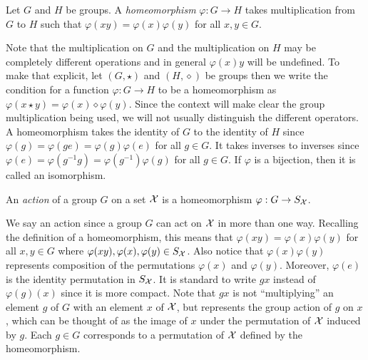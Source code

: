 \begin{definition}
Let $G$ and $H$ be groups.  A \emph{homeomorphism} $\varphi: G \to H$ takes multiplication
from $G$ to $H$ such that $\varphi(xy) = \varphi(x)\varphi(y)$ for all $x, y \in G$.
\end{definition}

Note that the multiplication on $G$ and the multiplication on $H$ may be completely different operations
and in general $\varphi(x)y$ will be undefined.
To make that explicit, let $(G, \star)$ and $(H, \diamond)$ be groups then we write the
condition for a function $\varphi: G \to H$ to be a homeomorphism as
$\varphi(x \star y) = \varphi(x)  \diamond \varphi(y)$.  
Since the context will make clear the group multiplication being used, we will not usually
distinguish the different  operators.
A homeomorphism takes the identity of $G$ to the identity of $H$
since $\varphi(g) = \varphi(ge) = \varphi(g)\varphi(e)$ for all $g \in G$. It takes inverses to 
inverses since $\varphi(e) = \varphi(g^{-1}g) = \varphi(g^{-1})\varphi(g)$ for all $g \in G$.
If $\varphi$ is a bijection, then it is called an isomorphism.

\begin{definition}
An \emph{action} of a group $G$ on a set $\mathcal{X}$ is a homeomorphism $\varphi: G \to S_{\mathcal{X}}$.
\end{definition}

We say an action since a group $G$ can act on $\mathcal{X}$ in more than one way. Recalling the
definition of a homeomorphism, this means that $\varphi(xy) = \varphi(x)\varphi(y)$ for all
$x, y \in G$ where $\varphi(xy), \varphi(x), \varphi(y) \in S_{\mathcal{X}}$.  Also notice that
$\varphi(x)\varphi(y)$ represents composition of the permutations $\varphi(x)$ and 
$\varphi(y)$.  Moreover, $\varphi(e)$ is the identity permutation in $S_{\mathcal{X}}$.
It is standard to write $gx$ instead of $\varphi(g)(x)$ since it is more compact.
Note that $gx$ is not ``multiplying'' an element $g$ of $G$ with an element $x$ of $\mathcal{X}$,
but represents the group action
of $g$ on $x$, which can be thought of as the image of $x$ under the permutation of $\mathcal{X}$
induced by $g$.  Each $g \in G$ corresponds to a permutation of $\mathcal{X}$ defined by the
homeomorphism.

%
%




